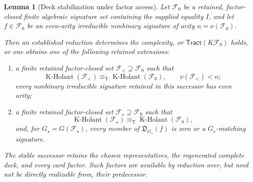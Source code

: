 \documentclass[11pt,letterpaper,onecolumn]{article}
\theoremstyle{plain}
\newtheorem{lemma}[lemma]{Lemma}
\theoremstyle{definition}
\theoremstyle{remark}
\newcommand{\cF}{\mathcal F}
\newcommand{\KHolant}{\operatorname{K\text{-}Holant}}
\newcommand{\Tract}{\mathsf{Tract}}
\newcommand{\equivT}{\equiv_{\mathrm T}}
\begin{document}
\begin{lemma}[Deck stabilization under factor access]
\label{lem:minimum-core-deck}
Let \(\cF_0\) be a retained, factor-closed finite algebraic
signature set containing the supplied equality \(I\), and let
\(f\in\cF_0\) be an even-arity irreducible nonbinary signature of
arity \(n=\nu(\cF_0)\).

Then an established reduction determines the complexity, or
\(\Tract(K\cF_0)\) holds, or one obtains one of the following
retained extensions:
\begin{enumerate}
\item a finite retained factor-closed set
      \(\cF_{<}\supseteq\cF_0\) such that
      \[
        \KHolant(\cF_{<})\equivT\KHolant(\cF_0),
        \qquad \nu(\cF_{<})<n;
      \]
      every nonbinary irreducible signature retained in this successor has even arity;
\item a finite retained factor-closed set
      \(\cF_\star\supseteq\cF_0\) such that
\begin{equation*}
  \KHolant(\cF_\star)
  \equivT
  \KHolant(\cF_0),
\end{equation*}
and, for \(G_\star=G(\cF_\star)\), every member of
\(\mathfrak D_{G_\star}(f)\) is zero or a
\(G_\star\)-matching signature.
\end{enumerate}

The stable successor retains the chosen representatives, the regenerated
complete deck, and every card factor.  Such factors are available by reduction over,
but need not be directly realizable from, their predecessor.
\end{lemma}
\end{document}
